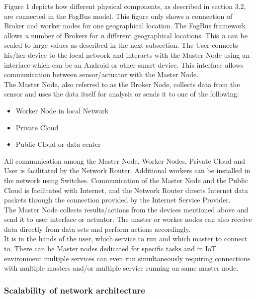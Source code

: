 \documentclass[10pt,journal,compsoc]{IEEEtran}
\begin{document}
Figure 1 depicts how different physical components, as described in section 3.2, are connected in the FogBus model. This figure only shows a connection of Broker and worker nodes for one geographical location. The FogBus framework allows \textit{n} number of Brokers for \textit{n} different geographical locations. This \textit{n} can be scaled to large values as described in the next subsection. The User connects his/her device to the local network and interacts with the Master Node using an interface which can be an Android or other smart device. This interface allows communication between sensor/actuator with the Master Node. \\
The Master Node, also referred to as the Broker Node, collects data from the sensor and uses the data itself for analysis or sends it to one of the following:
\begin{itemize}
\item Worker Node in local Network
\item Private Cloud
\item Public Cloud or data center
\end{itemize}
All communication among the Master Node, Worker Nodes, Private Cloud and User is facilitated by the Network Router. Additional workers can be installed in the network using Switches. Communication of the Master Node and the Public Cloud is facilitated with Internet, and the Network Router directs Internet data packets through the connection provided by the Internet Service Provider.\\
The Master Node collects results/actions from the devices mentioned above and send it to user interface or actuator. The master or worker nodes can also receive data directly from data sets and perform actions accordingly. \\
It is in the hands of the user, which service to run and which master to connect to. There can be Master nodes dedicated for specific tasks and in IoT environment multiple services can even run simultaneously requiring connections with multiple masters and/or multiple service running on same master node. 

\subsubsection{Scalability of network architecture}
\end{document}
